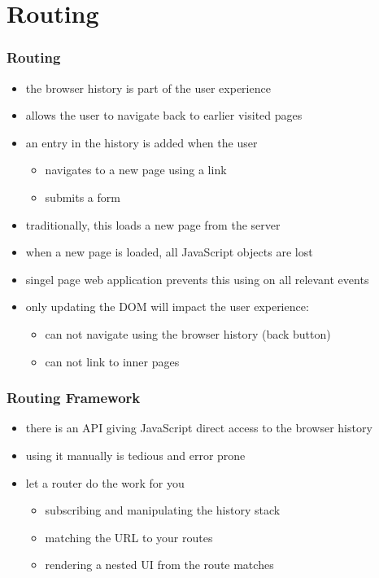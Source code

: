 \section{Routing}
\begin{frame}[fragile] \frametitle{Routing}
\begin{itemize}
  \item the browser history is part of the user experience
  \item allows the user to navigate back to earlier visited pages
  \item an entry in the history is added when the user
  \begin{itemize}
    \item navigates to a new page using a link
    \item submits a form
  \end{itemize}
  \item traditionally, this loads a new page from the server
  \item when a new page is loaded, all JavaScript objects are lost
  \item singel page web application prevents this using  on all relevant events
  \item only updating the DOM will impact the user experience:
  \begin{itemize}
    \item can not navigate using the browser history (back button)
    \item can not link to inner pages
  \end{itemize}
\end{itemize}
\end{frame}

\begin{frame}[fragile] \frametitle{Routing Framework}
\begin{itemize}
  \item there is an API giving JavaScript direct access to the browser history
  \item using it manually is tedious and error prone
  \item let a router do the work for you
  \begin{itemize}
    \item subscribing and manipulating the history stack
    \item matching the URL to your routes
    \item rendering a nested UI from the route matches
  \end{itemize}
\end{itemize}

\vspace{10mm}
\end{frame}

